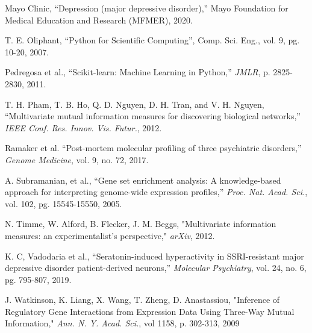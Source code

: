 \documentclass{bioinfo}
\begin{document}
\begin{thebibliography}{}
Mayo Clinic, “Depression (major depressive disorder),” Mayo Foundation for Medical Education and Research (MFMER), 2020.

T. E. Oliphant, “Python for Scientific Computing”, Comp. Sci. Eng., vol. 9,  pg. 10-20, 2007.

Pedregosa et al., “Scikit-learn: Machine Learning in Python,” {\it JMLR}, p. 2825-2830, 2011.

T. H. Pham, T. B. Ho, Q. D. Nguyen, D. H. Tran, and V. H. Nguyen, “Multivariate mutual information measures for discovering biological networks,” {\it IEEE Conf. Res. Innov. Vis. Futur.}, 2012.

Ramaker et al. “Post-mortem molecular profiling of three psychiatric disorders,” {\it Genome Medicine}, vol. 9, no. 72, 2017.

A. Subramanian, et al., “Gene set enrichment analysis: A knowledge-based approach for interpreting genome-wide expression profiles,” {\it Proc. Nat. Acad. Sci.}, vol. 102, pg. 15545-15550, 2005.

N. Timme, W. Alford, B. Flecker, J. M. Beggs, "Multivariate information measures: an experimentalist's perspective," {\it arXiv}, 2012.

K. C, Vadodaria et al., “Seratonin-induced hyperactivity in SSRI-resistant major depressive disorder patient-derived neurons,” {\it Molecular Psychiatry}, vol. 24, no. 6,  pg. 795-807, 2019.

J. Watkinson, K. Liang, X. Wang, T. Zheng, D. Anastassiou, "Inference of Regulatory Gene Interactions from Expression Data Using Three-Way Mutual Information," {\it Ann. N. Y. Acad. Sci.}, vol 1158, p. 302-313, 2009
\end{thebibliography}
\end{document}
